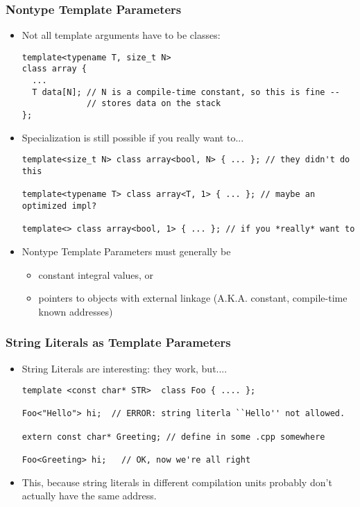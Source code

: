 \begin{frame}[fragile,t]
\frametitle{Nontype Template Parameters}
\begin{itemize}[<+->]

\item Not all template arguments have to be classes:
{\scriptsize
\begin{verbatim}
template<typename T, size_t N>
class array {
  ...
  T data[N]; // N is a compile-time constant, so this is fine --
             // stores data on the stack
};
\end{verbatim}
}
\vskip 12pt
\item Specialization is still possible if you really want to...
{\scriptsize
\begin{verbatim}
template<size_t N> class array<bool, N> { ... }; // they didn't do this

template<typename T> class array<T, 1> { ... }; // maybe an optimized impl?

template<> class array<bool, 1> { ... }; // if you *really* want to
\end{verbatim}
}

\vskip 12pt

\item Nontype Template Parameters must generally be 
\begin{itemize}
  \item constant integral values, or
  \item pointers to objects with external linkage (A.K.A. constant, compile-time known addresses)
\end{itemize}
\end{itemize}

\end{frame}


\begin{frame}[fragile,t]
\frametitle{String Literals as Template Parameters}

\begin{itemize}[<+->]
\item String Literals are interesting: they work, but....
{\scriptsize
\begin{verbatim}
template <const char* STR>  class Foo { .... };

Foo<"Hello"> hi;  // ERROR: string literla ``Hello'' not allowed.

extern const char* Greeting; // define in some .cpp somewhere

Foo<Greeting> hi;   // OK, now we're all right
\end{verbatim}
}
\vskip 12pt 
\item This, because string literals in different compilation units probably don't actually have the same address.
\end{itemize}

\end{frame}

